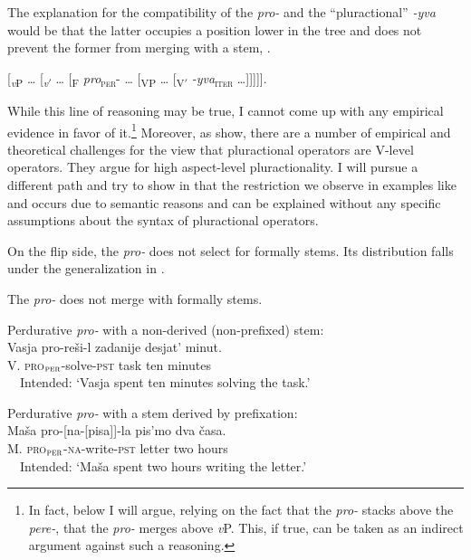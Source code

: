 \documentclass[output=paper,colorlinks,citecolor=brown,newtxmath]{langsci/langscibook}
\begin{document}
\noindent The explanation for the compatibility of the  \textit{pro-} and the ``pluractional''
\textit{-yva} would be that the latter occupies a position lower in the tree and does not prevent the former from merging with a stem, .

\ea \label{ex:naumov:11}
{[\textsubscript{\textit{v}P} {\ldots} [\textsubscript{\textit{v}$'$} {\ldots} [\textsubscript{F} \textit{pro}\textsubscript{\textsc{per}}- {\ldots} [\textsubscript{VP} {\ldots} [\textsubscript{V$'$} \textit{-yva}\textsubscript{\textsc{iter}}  {\ldots}]]]]].}
\z

\noindent While this line of reasoning may be true, I cannot come up with any empirical evidence in favor of it.\footnote{In fact, below I will argue, relying on the fact that the  \textit{pro-} stacks above the  \textit{pere-}, that the  \textit{pro-} merges above \textit{v}P. This, if true, can be taken as an indirect argument against such a reasoning.} Moreover, as \citet{gianina2015pluractionality} show, there are a number of empirical and theoretical challenges for the view that pluractional operators are V-level operators. They argue for high aspect-level pluractionality. I will pursue a different path and try to show in  that the restriction we observe in examples like  and  occurs due to semantic reasons and can be explained without any specific assumptions about the syntax of pluractional operators.

On the flip side, the  \textit{pro-} does not select for formally  stems. Its distribution falls under the generalization in .

\ea \label{ex:naumov:12}
The  \textit{pro-} does not merge with formally  stems.
\z

    \ea Perdurative \textit{pro-} with a non-derived (non-prefixed)  stem:\label{ex:naumov:13}\smallskip\\
    \gll * Vasja		pro-reši-l			zadanije	desjat’		minut.\\
    {} V.		\textsc{pro}$_\textsc{per}$-solve-\textsc{pst}		task		ten		minutes
    \\
    \glt \ \ Intended: `Vasja spent ten minutes solving the task.'
    \z

    \ea Perdurative \textit{pro-} with a  stem derived by prefixation:\label{ex:naumov:14}\smallskip\\
    \gll * Maša	pro-[na-[pisa]]-la		pis’mo		dva	časa.\\
    {} M.	\textsc{pro}$_\textsc{per}$-\textsc{na}-write-\textsc{pst}	letter		two	hours\\
    \glt \ \ Intended: `Maša spent two hours writing the letter.'
    \z
\end{document}
